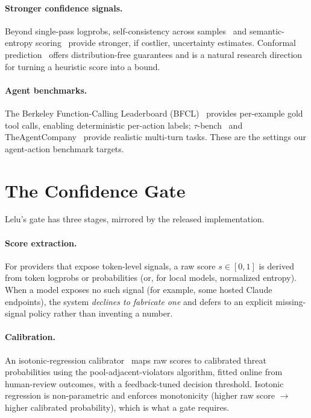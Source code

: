 \documentclass[10pt,twocolumn]{article}
\begin{document}
\paragraph{Stronger confidence signals.}
Beyond single-pass logprobs, self-consistency across samples~\cite{wang2022self}
and semantic-entropy scoring~\cite{kuhn2023semantic,farquhar2024detecting}
provide stronger, if costlier, uncertainty estimates. Conformal
prediction~\cite{angelopoulos2021gentle} offers distribution-free guarantees and
is a natural research direction for turning a heuristic score into a bound.

\paragraph{Agent benchmarks.}
The Berkeley Function-Calling Leaderboard (BFCL)~\cite{patil2023gorilla} provides
per-example gold tool calls, enabling deterministic per-action labels;
$\tau$-bench~\cite{yao2024taubench} and TheAgentCompany~\cite{xu2024agentcompany}
provide realistic multi-turn tasks. These are the settings our agent-action
benchmark targets.

\section{The Confidence Gate}
Lelu's gate has three stages, mirrored by the released implementation.

\paragraph{Score extraction.}
For providers that expose token-level signals, a raw score $s\in[0,1]$ is derived
from token logprobs or probabilities (or, for local models, normalized entropy).
When a model exposes no such signal (for example, some hosted Claude endpoints),
the system \emph{declines to fabricate one} and defers to an explicit
missing-signal policy rather than inventing a number.

\paragraph{Calibration.}
An isotonic-regression calibrator~\cite{niculescu2005predicting} maps raw scores
to calibrated threat probabilities using the pool-adjacent-violators algorithm,
fitted online from human-review outcomes, with a feedback-tuned decision
threshold. Isotonic regression is non-parametric and enforces monotonicity
(higher raw score $\rightarrow$ higher calibrated probability), which is what a
gate requires.
\end{document}
